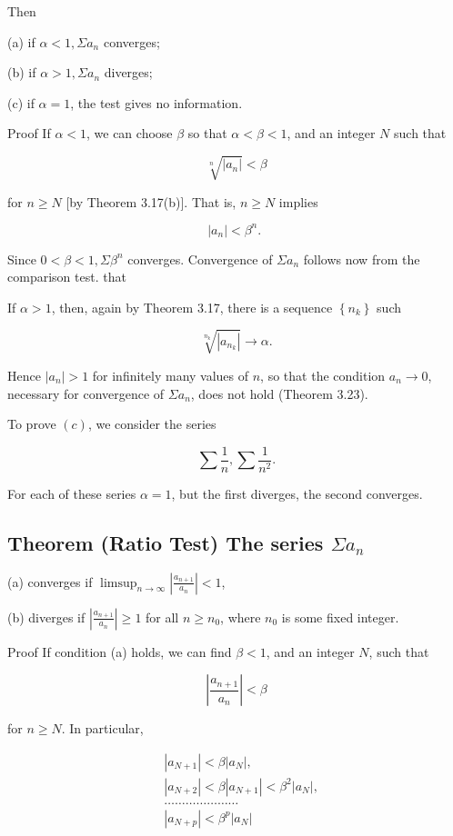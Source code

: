 \documentclass[10pt]{article}
\begin{document}
Then

(a) if $\alpha<1, \Sigma a_{n}$ converges;

(b) if $\alpha>1, \Sigma a_{n}$ diverges;

(c) if $\alpha=1$, the test gives no information.

Proof If $\alpha<1$, we can choose $\beta$ so that $\alpha<\beta<1$, and an integer $N$ such that

$$
\sqrt[n]{\left|a_{n}\right|}<\beta
$$

for $n \geq N$ [by Theorem 3.17(b)]. That is, $n \geq N$ implies

$$
\left|a_{n}\right|<\beta^{n} \text {. }
$$

Since $0<\beta<1, \Sigma \beta^{n}$ converges. Convergence of $\Sigma a_{n}$ follows now from the comparison test. that

If $\alpha>1$, then, again by Theorem 3.17, there is a sequence $\left\{n_{k}\right\}$ such

$$
\sqrt[n_{k}]{\left|a_{n_{k}}\right|} \rightarrow \alpha .
$$

Hence $\left|a_{n}\right|>1$ for infinitely many values of $n$, so that the condition $a_{n} \rightarrow 0$, necessary for convergence of $\Sigma a_{n}$, does not hold (Theorem 3.23).

To prove $(c)$, we consider the series

$$
\sum \frac{1}{n}, \sum \frac{1}{n^{2}} .
$$

For each of these series $\alpha=1$, but the first diverges, the second converges.

\subsection{Theorem (Ratio Test) The series $\Sigma a_{n}$}
(a) converges if $\limsup _{n \rightarrow \infty}\left|\frac{a_{n+1}}{a_{n}}\right|<1$,

(b) diverges if $\left|\frac{a_{n+1}}{a_{n}}\right| \geq 1$ for all $n \geq n_{0}$, where $n_{0}$ is some fixed integer.

Proof If condition (a) holds, we can find $\beta<1$, and an integer $N$, such that

$$
\left|\frac{a_{n+1}}{a_{n}}\right|<\beta
$$

for $n \geq N$. In particular,

$$
\begin{aligned}
& \left|a_{N+1}\right|<\beta\left|a_{N}\right|, \\
& \left|a_{N+2}\right|<\beta\left|a_{N+1}\right|<\beta^{2}\left|a_{N}\right|, \\
& \ldots \ldots \ldots \ldots \ldots \ldots \ldots \\
& \left|a_{N+p}\right|<\beta^{p}\left|a_{N}\right|
\end{aligned}
$$
\end{document}
